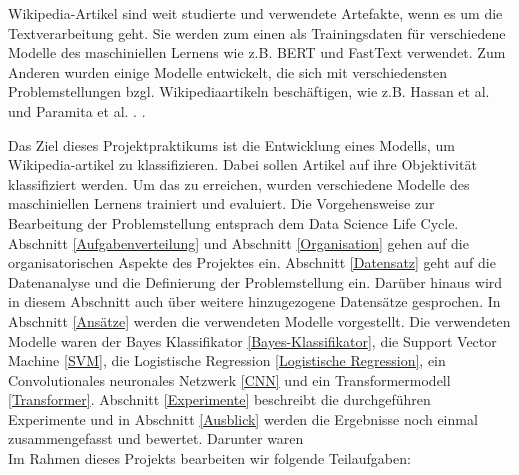 Wikipedia-Artikel sind weit studierte und verwendete Artefakte, wenn es um die Textverarbeitung geht. Sie werden zum einen als Trainingsdaten für verschiedene Modelle des maschiniellen Lernens wie z.B. BERT \cite{BERTReference} und FastText \cite{DBLP:journals/corr/BojanowskiGJM16} verwendet. Zum Anderen wurden einige Modelle entwickelt, die sich mit verschiedensten Problemstellungen bzgl. Wikipediaartikeln beschäftigen, wie z.B. Hassan et al. \cite{shavarani2020multiclassmultilingualclassificationwikipedia} und Paramita et al. \cite{das2024languageagnosticmodelingwikipediaarticles}. .


Das Ziel dieses Projektpraktikums ist die Entwicklung eines Modells, um Wikipedia-artikel zu klassifizieren. Dabei sollen Artikel auf ihre Objektivität klassifiziert werden. Um das zu erreichen, wurden verschiedene Modelle des maschiniellen Lernens trainiert und evaluiert. Die Vorgehensweise zur Bearbeitung der Problemstellung entsprach dem Data Science Life Cycle. Abschnitt \ref{Aufgabenverteilung} und Abschnitt \ref{Organisation} gehen auf die organisatorischen Aspekte des Projektes ein. Abschnitt \ref{Datensatz} geht auf die Datenanalyse und die Definierung der Problemstellung ein. Darüber hinaus wird in diesem Abschnitt auch über weitere hinzugezogene Datensätze gesprochen. In Abschnitt \ref{Ansätze} werden die verwendeten Modelle vorgestellt. Die verwendeten Modelle waren der Bayes Klassifikator \ref{Bayes-Klassifikator}, die Support Vector Machine \ref{SVM}, die Logistische Regression \ref{Logistische Regression}, ein Convolutionales neuronales Netzwerk \ref{CNN} und ein Transformermodell \ref{Transformer}. Abschnitt \ref{Experimente} beschreibt die durchgeführen Experimente und in Abschnitt \ref{Ausblick} werden die Ergebnisse noch einmal zusammengefasst und bewertet.
 Darunter waren \\
Im Rahmen dieses Projekts bearbeiten wir folgende Teilaufgaben:

